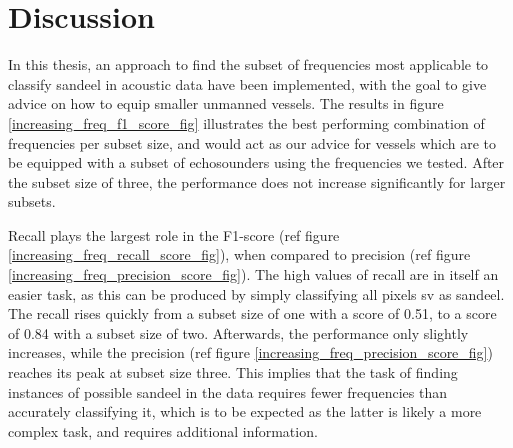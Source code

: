 \chapter{Discussion}

    In this thesis, an approach to find the subset of frequencies most applicable to classify sandeel in acoustic data have been implemented, with the goal to give advice on how to equip smaller unmanned vessels. The results in figure  \ref{increasing_freq_f1_score_fig} illustrates the best performing combination of frequencies per subset size, and would act as our advice for vessels which are to be equipped with a subset of echosounders using the frequencies we tested. After the subset size of three, the performance does not increase significantly for larger subsets. 
    
    
    
    
    Recall plays the largest role in the F1-score (ref figure \ref{increasing_freq_recall_score_fig}), when compared to precision (ref figure \ref{increasing_freq_precision_score_fig}). The high values of recall are in itself an easier task, as this can be produced by simply classifying all pixels \gls{sv} as sandeel. The recall rises quickly from a subset size of one with a score of 0.51, to a score of 0.84 with a subset size of two. Afterwards, the performance  only slightly increases, while the precision (ref figure \ref{increasing_freq_precision_score_fig}) reaches its peak at subset size three. This implies that the task of finding instances of possible sandeel in the data requires fewer frequencies than accurately classifying it, which is to be expected as the latter is likely a more complex task, and requires additional information. 
    

